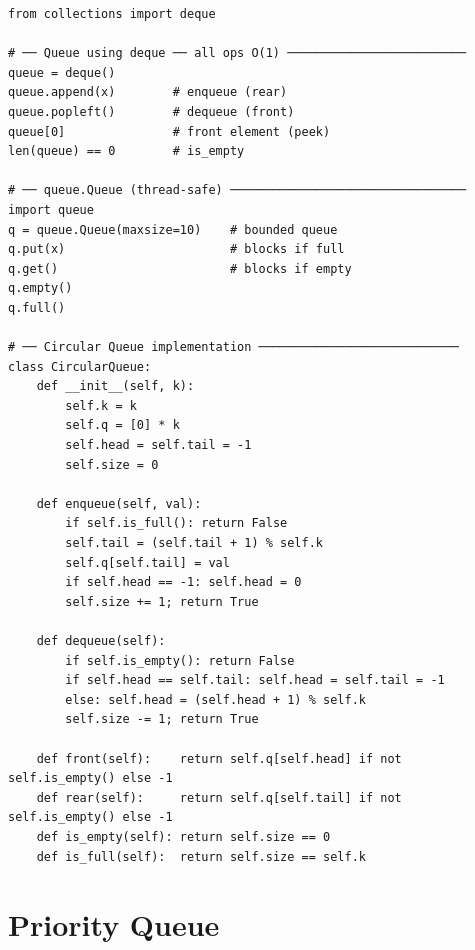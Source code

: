 \documentclass[11pt,a4paper]{report}
\begin{document}
\begin{lstlisting}
from collections import deque

# ── Queue using deque ── all ops O(1) ─────────────────────────
queue = deque()
queue.append(x)        # enqueue (rear)
queue.popleft()        # dequeue (front)
queue[0]               # front element (peek)
len(queue) == 0        # is_empty

# ── queue.Queue (thread-safe) ─────────────────────────────────
import queue
q = queue.Queue(maxsize=10)    # bounded queue
q.put(x)                       # blocks if full
q.get()                        # blocks if empty
q.empty()
q.full()

# ── Circular Queue implementation ────────────────────────────
class CircularQueue:
    def __init__(self, k):
        self.k = k
        self.q = [0] * k
        self.head = self.tail = -1
        self.size = 0

    def enqueue(self, val):
        if self.is_full(): return False
        self.tail = (self.tail + 1) % self.k
        self.q[self.tail] = val
        if self.head == -1: self.head = 0
        self.size += 1; return True

    def dequeue(self):
        if self.is_empty(): return False
        if self.head == self.tail: self.head = self.tail = -1
        else: self.head = (self.head + 1) % self.k
        self.size -= 1; return True

    def front(self):    return self.q[self.head] if not self.is_empty() else -1
    def rear(self):     return self.q[self.tail] if not self.is_empty() else -1
    def is_empty(self): return self.size == 0
    def is_full(self):  return self.size == self.k
\end{lstlisting}

\section{Priority Queue}
\end{document}
